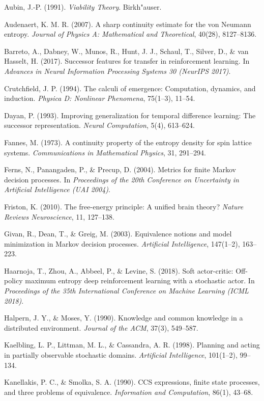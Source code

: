 \documentclass[11pt]{article}
\begin{document}
Aubin, J.-P. (1991). \emph{Viability Theory}. Birkh"auser.

Audenaert, K. M. R. (2007). A sharp continuity estimate for the von Neumann entropy. \emph{Journal of Physics A: Mathematical and Theoretical}, 40(28), 8127--8136.

Barreto, A., Dabney, W., Munos, R., Hunt, J. J., Schaul, T., Silver, D., \& van Hasselt, H. (2017). Successor features for transfer in reinforcement learning. In \emph{Advances in Neural Information Processing Systems 30 (NeurIPS 2017)}.

Crutchfield, J. P. (1994). The calculi of emergence: Computation, dynamics, and induction. \emph{Physica D: Nonlinear Phenomena}, 75(1--3), 11--54.

Dayan, P. (1993). Improving generalization for temporal difference learning: The successor representation. \emph{Neural Computation}, 5(4), 613--624.

Fannes, M. (1973). A continuity property of the entropy density for spin lattice systems. \emph{Communications in Mathematical Physics}, 31, 291--294.

Ferns, N., Panangaden, P., \& Precup, D. (2004). Metrics for finite Markov decision processes. In \emph{Proceedings of the 20th Conference on Uncertainty in Artificial Intelligence (UAI 2004)}.

Friston, K. (2010). The free-energy principle: A unified brain theory? \emph{Nature Reviews Neuroscience}, 11, 127--138.

Givan, R., Dean, T., \& Greig, M. (2003). Equivalence notions and model minimization in Markov decision processes. \emph{Artificial Intelligence}, 147(1--2), 163--223.

Haarnoja, T., Zhou, A., Abbeel, P., \& Levine, S. (2018). Soft actor-critic: Off-policy maximum entropy deep reinforcement learning with a stochastic actor. In \emph{Proceedings of the 35th International Conference on Machine Learning (ICML 2018)}.

Halpern, J. Y., \& Moses, Y. (1990). Knowledge and common knowledge in a distributed environment. \emph{Journal of the ACM}, 37(3), 549--587.

Kaelbling, L. P., Littman, M. L., \& Cassandra, A. R. (1998). Planning and acting in partially observable stochastic domains. \emph{Artificial Intelligence}, 101(1--2), 99--134.

Kanellakis, P. C., \& Smolka, S. A. (1990). CCS expressions, finite state processes, and three problems of equivalence. \emph{Information and Computation}, 86(1), 43--68.
\end{document}
